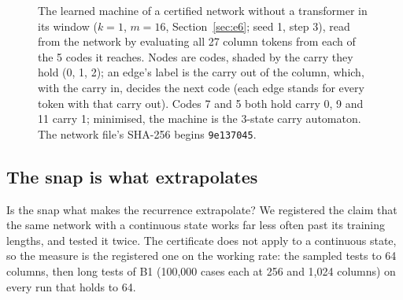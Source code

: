 \documentclass[11pt]{article}
\begin{document}
\begin{figure}[t]
\centering
{}
\caption{The learned machine of a certified network without a transformer in its window ($k = 1$,
$m = 16$, Section~\ref{sec:e6}; seed 1, step 3), read from the network by evaluating all 27 column
tokens from each of the 5 codes it reaches. Nodes are codes, shaded by the carry they hold (0, 1,
2); an edge's label is the carry out of the column, which, with the carry in, decides the next code
(each edge stands for every token with that carry out). Codes 7 and 5 both hold carry 0, 9 and 11
carry 1; minimised, the machine is the 3-state carry automaton. The network file's SHA-256 begins
\texttt{9e137045}.}
\label{fig:machine}
\end{figure}

\subsection{The snap is what extrapolates}
\label{sec:e2}

Is the snap what makes the recurrence extrapolate? We registered the claim that the same network
with a continuous state works far less often past its training lengths, and tested it twice. The
certificate does not apply to a continuous state, so the measure is the registered one on the
working rate: the sampled tests to 64 columns, then long tests of B1 (100{,}000 cases each at 256
and 1{,}024 columns) on every run that holds to 64.
\end{document}
